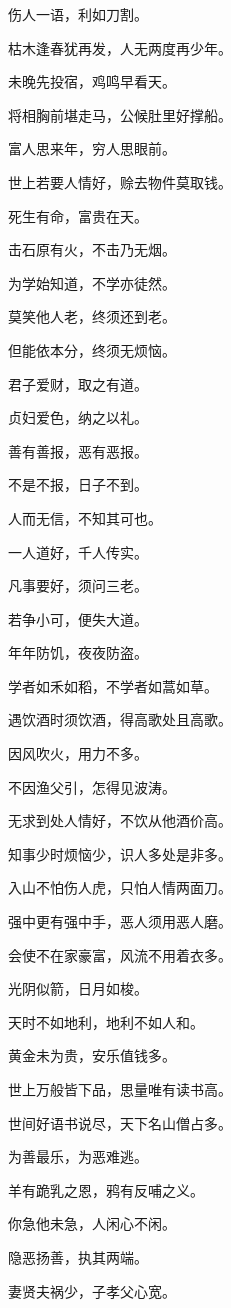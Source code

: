 \documentclass[12pt,oneside]{book}
\begin{document}
伤人一语，利如刀割。

枯木逢春犹再发，人无两度再少年。

未晚先投宿，鸡鸣早看天。

将相胸前堪走马，公候肚里好撑船。

富人思来年，穷人思眼前。

世上若要人情好，赊去物件莫取钱。

死生有命，富贵在天。

击石原有火，不击乃无烟。

为学始知道，不学亦徒然。

莫笑他人老，终须还到老。

但能依本分，终须无烦恼。

君子爱财，取之有道。

贞妇爱色，纳之以礼。

善有善报，恶有恶报。

不是不报，日子不到。

人而无信，不知其可也。

一人道好，千人传实。

凡事要好，须问三老。

若争小可，便失大道。

年年防饥，夜夜防盗。

学者如禾如稻，不学者如蒿如草。

遇饮酒时须饮酒，得高歌处且高歌。

因风吹火，用力不多。

不因渔父引，怎得见波涛。

无求到处人情好，不饮从他酒价高。

知事少时烦恼少，识人多处是非多。

入山不怕伤人虎，只怕人情两面刀。

强中更有强中手，恶人须用恶人磨。

会使不在家豪富，风流不用着衣多。

光阴似箭，日月如梭。

天时不如地利，地利不如人和。

黄金未为贵，安乐值钱多。

世上万般皆下品，思量唯有读书高。

世间好语书说尽，天下名山僧占多。

为善最乐，为恶难逃。

羊有跪乳之恩，鸦有反哺之义。

你急他未急，人闲心不闲。

隐恶扬善，执其两端。

妻贤夫祸少，子孝父心宽。
\end{document}

